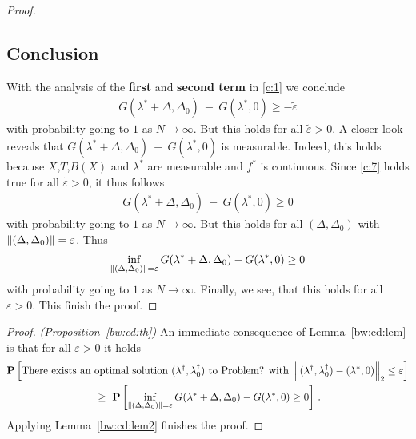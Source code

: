 \begin{proof}
\subsection*{Conclusion}
With the analysis of the \textbf{first} and \textbf{second term} in
\eqref{c:1} we conclude
\begin{gather}
  \label{c:7}
  G
     (
     \lambda^*
      +
      \Delta
      ,
     \Delta_0
     )
     \ 
     -
     \ 
     G
     (
     \lambda^*,
     0
     )
     \ge
     -
     \tilde{\varepsilon}
\end{gather}
with probability going to $1$ as $N\to \infty$.
But this holds for all $\tilde{\varepsilon}>0$.
A closer look reveals that
$
  G
     (
     \lambda^*
      +
      \Delta
      ,
     \Delta_0
     )
     \ 
     -
     \ 
     G
     (
     \lambda^*,
     0
     )
$ 
is measurable.
Indeed, this holds because $X$,$T$,$B(X)$ and $\lambda^*$ are measurable and $f^*$ is continuous.
Since \eqref{c:7} holds true for all $\tilde{\varepsilon}>0$, it thus follows 
\begin{gather}
  G
     (
     \lambda^*
      +
      \Delta
      ,
     \Delta_0
     )
     \ 
     -
     \ 
     G
     (
     \lambda^*,
     0
     )
     \ge
     0
\end{gather}
with probability going to $1$ as $N\to \infty$.
But this holds for all 
$
(\Delta,\Delta_0)
$
with 
$
\left\lVert
(\Delta,\Delta_0)
\right\rVert
=\varepsilon
$. Thus
\begin{gather}
   \inf _ { 
       \left\lVert
         (
     \Delta
     ,
     \Delta_0
         )
 \right\rVert 
= \varepsilon }
     G
     (
     \lambda^*
      +
      \Delta
      ,
     \Delta_0
     )
     -
     G
     (
     \lambda^*,
     0
     )
     \ge 
     0
\end{gather}
with probability going to $1$ as $N\to \infty$.
Finally, we see, that this holds for all $\varepsilon>0$. This finish the proof.
 \end{proof}

\begin{proof}
  \emph{(Proposition~\ref{bw:cd:th})}
An immediate consequence of Lemma~\ref{bw:cd:lem} is
that for all $\varepsilon>0$ it holds
\begin{gather*}
   \P
   \left[ 
     \text{There exists an optimal solution $(\lambda^\dagger,\lambda_0^\dagger)$ to Problem? with}
     \ 
     \norm
     {
       (\lambda^\dagger,\lambda_0^\dagger)
      -
      (\lambda^*,0)
     }_2
     \le
     \varepsilon
   \right]
   \\
   \
   \ge
   \ 
   \P
   \left[ 
     \inf _ { 
       \norm{
         (
     \Delta
     ,
     \Delta_0
         )
 } 
= \varepsilon }
     G
     (
     \lambda^*
      +
      \Delta
      ,
     \Delta_0
     )
     -
     G
     (
     \lambda^*,
     0
     )
     \ge 
     0
   \right]
   \,.
 \end{gather*}
 Applying Lemma~\ref{bw:cd:lem2} finishes the proof.
\end{proof}

